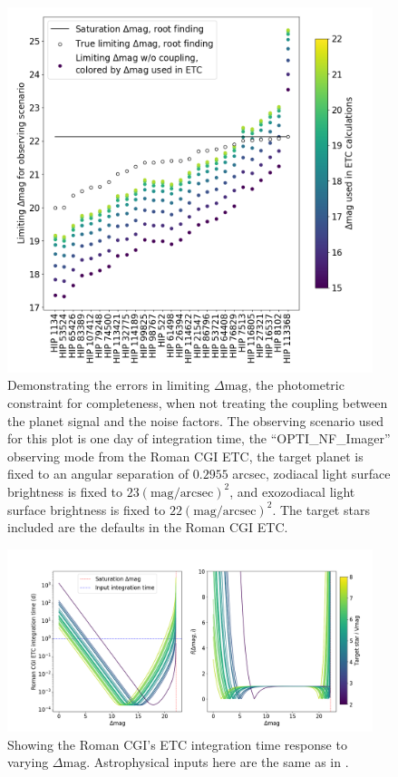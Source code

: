 \begin{figure}
  \begin{center}
    \includegraphics[width=0.95\textwidth]{ch2/figures/coupling.png}
  \end{center}
  \caption{Demonstrating the errors in limiting $\Delta\textrm{mag}$, the
  photometric constraint for completeness, when not treating the coupling
  between the planet signal and the noise factors. The observing scenario
  used for this plot is one day of integration time, the ``OPTI\_NF\_Imager''
  observing mode from the Roman CGI ETC, the target planet is fixed to an
  angular separation of $0.2955$ arcsec, zodiacal light surface brightness is fixed to
  $23 (\textrm{mag}/\textrm{arcsec})^2$, and exozodiacal light surface brightness is
  fixed to $22 (\textrm{mag}/\textrm{arcsec})^2$. The target stars included are the defaults
  in the Roman CGI ETC.}
  \label{fig:CGI_coupling}
\end{figure}

\begin{figure}
  \begin{center}
    \includegraphics[width=0.95\textwidth]{ch2/figures/ETC_dMag_function.png}
  \end{center}
  \caption{Showing the Roman CGI's ETC integration time response to varying
  $\Delta\textrm{mag}$. Astrophysical inputs here are the same
  as in .}
  \label{fig:ETC_dMag_function}
\end{figure}

